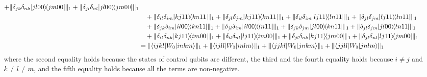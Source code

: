 \documentclass[a4paper,twocolumn,accepted=2022-10-23]{quantumarticle}
\newcommand{\bra}[1]{\langle {#1} \vert}
\newcommand{\ket}[1]{\vert {#1} \rangle}
\newcommand{\ketbra}[2]{\vert {#1} \rangle\!\langle {#2} \vert}
\theoremstyle{definition}
\begin{document}
\begin{align}
+ \| \delta_{jk}\delta_{nk} \ketbra{jl00}{jm00} \|_1 + \| \delta_{jl}\delta_{nl}\ketbra{jl00}{jm00} \|_1 \notag \\
&\quad + \| \delta_{il}\delta_{im} \ketbra{kj11}{kn11} \|_1 + \| \delta_{jl}\delta_{jm} \ketbra{kj11}{kn11} \|_1
+ \| \delta_{il}\delta_{im} \ketbra{lj11}{ln11} \|_1 + \| \delta_{jl}\delta_{jm} \ketbra{lj11}{ln11} \|_1 \notag \\
&\quad + \| \delta_{jk}\delta_{im} \ketbra{il00}{kn11} \|_1 + \| \delta_{jl}\delta_{im} \ketbra{il00}{ln11} \|_1
+ \| \delta_{jk}\delta_{jm} \ketbra{jl00}{kn11} \|_1 + \| \delta_{jl}\delta_{jm} \ketbra{jl00}{ln11} \|_1 \notag \\
&\quad + \| \delta_{il}\delta_{nk} \ketbra{kj11}{im00} \|_1 + \| \delta_{il}\delta_{nl} \ketbra{lj11}{im00} \|_1
+ \| \delta_{jl}\delta_{nk} \ketbra{kj11}{jm00} \|_1 + \| \delta_{jl}\delta_{nl} \ketbra{lj11}{jm00} \|_1 \\
%
&= \| \bra{ijkl} {W_0} \ket{inkm} \|_1 + \| \bra{ijll} {W_0} \ket{inlm} \|_1 + \| \bra{jjkl} {W_0} \ket{jnkm} \|_1 + \| \bra{jjll} {W_0} \ket{jnlm} \|_1
\end{align}
where the second equality holds because the states of control qubits are different,
the third and the fourth equality holds because $i \neq j$ and $k \neq l \neq m$,
and the fifth equality holds because all the terms are non-negative.
\end{document}
